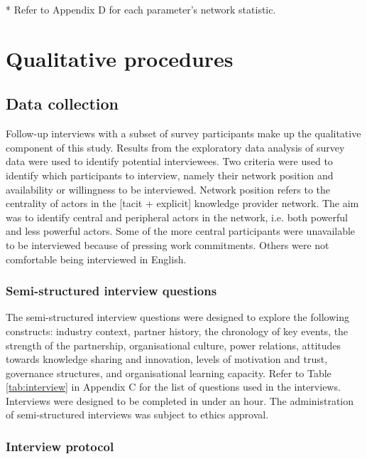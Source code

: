 \begin{table}[!htbp]
{\begin{threeparttable}
\begin{tablenotes}
\footnotesize
* Refer to Appendix D for each parameter's network statistic.
\end{tablenotes}

\end{threeparttable}
%
}
\end{table}

\section{Qualitative procedures}

\subsection{Data collection}

Follow-up interviews with a subset of survey participants make up the qualitative component of this study. Results from the exploratory data analysis of survey data were used to identify potential interviewees. Two criteria were used to identify which participants to interview, namely their network position and availability or willingness to be interviewed. Network position refers to the centrality of actors in the [tacit + explicit] knowledge provider network. The aim was to identify central and peripheral actors in the network, i.e. both powerful and less powerful actors. Some of the more central participants were unavailable to be interviewed because of pressing work commitments. Others were not comfortable being interviewed in English. 

\subsubsection{Semi-structured interview questions}

The semi-structured interview questions were designed to explore the following constructs: industry context, partner history, the chronology of key events, the strength of the partnership, organisational culture, power relations, attitudes towards knowledge sharing and innovation, levels of motivation and trust, governance structures, and organisational learning capacity. Refer to Table \ref{tab:interview} in Appendix C for the list of questions used in the interviews. Interviews were designed to be completed in under an hour. The administration of semi-structured interviews was subject to ethics approval. 

\subsubsection{Interview protocol}

